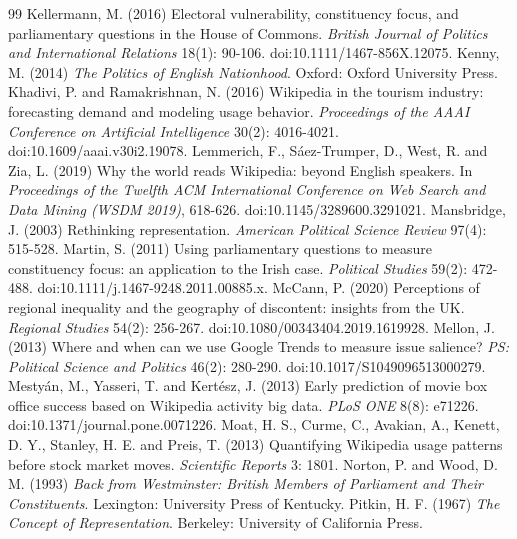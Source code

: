 \documentclass[11pt,a4paper]{article}
\begin{document}
\begin{thebibliography}{99}
 Kellermann, M. (2016) Electoral vulnerability, constituency focus, and parliamentary questions in the House of Commons. \emph{British Journal of Politics and International Relations} 18(1): 90-106. doi:10.1111/1467-856X.12075.
 Kenny, M. (2014) \emph{The Politics of English Nationhood}. Oxford: Oxford University Press.
 Khadivi, P. and Ramakrishnan, N. (2016) Wikipedia in the tourism industry: forecasting demand and modeling usage behavior. \emph{Proceedings of the AAAI Conference on Artificial Intelligence} 30(2): 4016-4021. doi:10.1609/aaai.v30i2.19078.
 Lemmerich, F., S\'aez-Trumper, D., West, R. and Zia, L. (2019) Why the world reads Wikipedia: beyond English speakers. In \emph{Proceedings of the Twelfth ACM International Conference on Web Search and Data Mining (WSDM 2019)}, 618-626. doi:10.1145/3289600.3291021.
 Mansbridge, J. (2003) Rethinking representation. \emph{American Political Science Review} 97(4): 515-528.
 Martin, S. (2011) Using parliamentary questions to measure constituency focus: an application to the Irish case. \emph{Political Studies} 59(2): 472-488. doi:10.1111/j.1467-9248.2011.00885.x.
 McCann, P. (2020) Perceptions of regional inequality and the geography of discontent: insights from the UK. \emph{Regional Studies} 54(2): 256-267. doi:10.1080/00343404.2019.1619928.
 Mellon, J. (2013) Where and when can we use Google Trends to measure issue salience? \emph{PS: Political Science and Politics} 46(2): 280-290. doi:10.1017/S1049096513000279.
 Mesty\'an, M., Yasseri, T. and Kert\'esz, J. (2013) Early prediction of movie box office success based on Wikipedia activity big data. \emph{PLoS ONE} 8(8): e71226. doi:10.1371/journal.pone.0071226.
 Moat, H. S., Curme, C., Avakian, A., Kenett, D. Y., Stanley, H. E. and Preis, T. (2013) Quantifying Wikipedia usage patterns before stock market moves. \emph{Scientific Reports} 3: 1801.
 Norton, P. and Wood, D. M. (1993) \emph{Back from Westminster: British Members of Parliament and Their Constituents}. Lexington: University Press of Kentucky.
 Pitkin, H. F. (1967) \emph{The Concept of Representation}. Berkeley: University of California Press.

\end{thebibliography}
\end{document}
